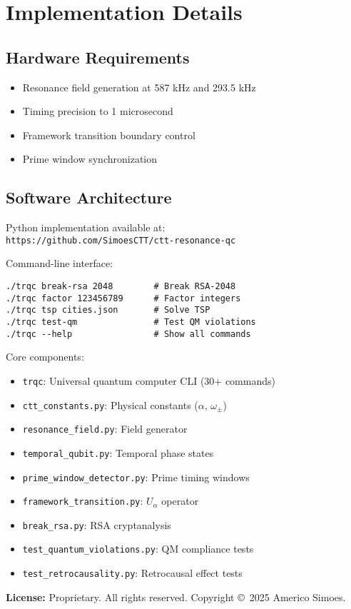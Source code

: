 \documentclass[12pt,a4paper]{article}
\begin{document}
\section{Implementation Details}

\subsection{Hardware Requirements}

\begin{itemize}
    \item Resonance field generation at 587 kHz and 293.5 kHz
    \item Timing precision to 1 microsecond
    \item Framework transition boundary control
    \item Prime window synchronization
\end{itemize}

\subsection{Software Architecture}

Python implementation available at:\\
\texttt{https://github.com/SimoesCTT/ctt-resonance-qc}

Command-line interface:
\begin{verbatim}
./trqc break-rsa 2048        # Break RSA-2048
./trqc factor 123456789      # Factor integers
./trqc tsp cities.json       # Solve TSP
./trqc test-qm               # Test QM violations
./trqc --help                # Show all commands
\end{verbatim}

Core components:
\begin{itemize}
    \item \texttt{trqc}: Universal quantum computer CLI (30+ commands)
    \item \texttt{ctt\_constants.py}: Physical constants ($\alpha$, $\omega_\pm$)
    \item \texttt{resonance\_field.py}: Field generator
    \item \texttt{temporal\_qubit.py}: Temporal phase states
    \item \texttt{prime\_window\_detector.py}: Prime timing windows
    \item \texttt{framework\_transition.py}: $U_\alpha$ operator
    \item \texttt{break\_rsa.py}: RSA cryptanalysis
    \item \texttt{test\_quantum\_violations.py}: QM compliance tests
    \item \texttt{test\_retrocausality.py}: Retrocausal effect tests
\end{itemize}

\textbf{License:} Proprietary. All rights reserved. Copyright \copyright\ 2025 Americo Simoes.
\end{document}
